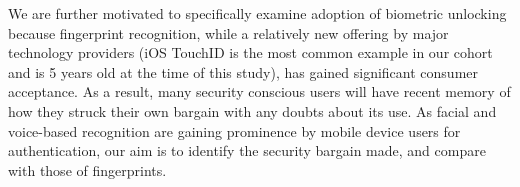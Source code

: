 %



We are further motivated to specifically examine adoption of biometric unlocking because fingerprint recognition, while a relatively new offering by major technology providers (iOS TouchID is the most common example in our cohort and is 5 years old at the time of this study), has gained significant consumer acceptance. %
As a result, many security conscious users will have recent memory of how they struck their own bargain with any doubts about its use. As facial and voice-based recognition are gaining prominence by mobile device users for authentication, our aim is to identify the security bargain made, and compare with those of fingerprints.


